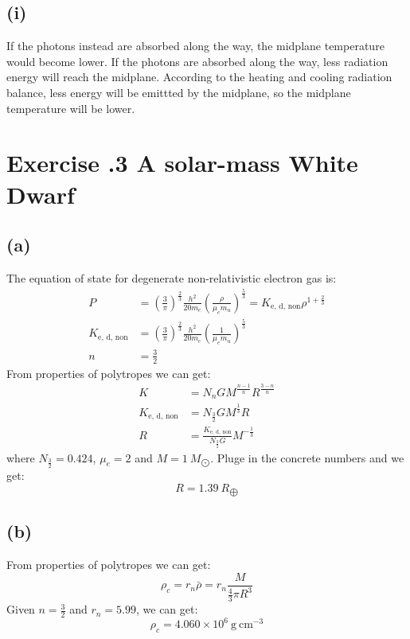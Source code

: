\documentclass[a4paper,12pt]{article}
\newcommand{\cm}{\mathrm{cm}}
\newcommand{\g}{\mathrm{g}}
\begin{document}
\subsection*{(i)}
If the photons instead are absorbed along the way, 
the midplane temperature would become lower.
If the photons are absorbed along the way,
less radiation energy will reach the midplane. 
According to the heating and cooling radiation balance, 
less energy will be emittted by the midplane, so the 
midplane temperature will be lower.

\section*{\textbf{Exercise \uppercase\expandafter{}.3 A solar-mass White Dwarf}}
\subsection*{(a)}
The equation of state for degenerate non-relativistic electron gas is:
\begin{align*}
    P &= (\frac{3}{\pi})^{\frac{2}{3}} \frac{h^2}{20 m_e} (\frac{\rho}{\mu_e m_u})^{\frac{5}{3}} 
    = K_{\text{e, d, non}} \rho^{1 + \frac{2}{3}}\\
    K_{\text{e, d, non}} &= (\frac{3}{\pi})^{\frac{2}{3}} \frac{h^2}{20 m_e} (\frac{1}{\mu_e m_u})^{\frac{5}{3}} \\
    n &= \frac{3}{2} 
\end{align*}
From properties of polytropes we can get:
\begin{align*}
    K &= N_n G M^{\frac{n-1}{n}} R^{\frac{3-n}{n}} \\
    K_{\text{e, d, non}} &= N_{\frac{3}{2}} G M^{\frac{1}{3}} R \\
    R &= \frac{K_{\text{e, d, non}}}{N_{\frac{3}{2}} G} M^{-\frac{1}{3}}
\end{align*}
where $N_{\frac{3}{2}} = 0.424$, $\mu_e = 2$ and $M = 1 \ M_{\bigodot}$. Pluge in the 
concrete numbers and we get:
\begin{equation*}
    R = 1.39 \ R_{\bigoplus}
\end{equation*}

\subsection*{(b)}
From properties of polytropes we can get:
\begin{equation*}
    \rho_c = r_n \bar{\rho} = r_n \frac{M}{\frac{4}{3} \pi R^3}
\end{equation*}
Given $n = \frac{3}{2}$ and $r_n = 5.99$, we can get:
\begin{equation*}
    \rho_c = 4.060\times 10^6 \ \g \ \cm^{-3}
\end{equation*}
\end{document}
